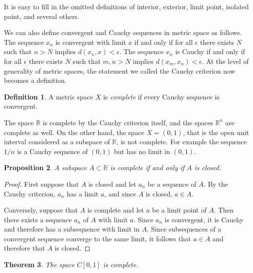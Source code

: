 \documentclass[11pt,oneside]{amsbook}
\newcommand{\RR}{\mathbb R}
\theoremstyle{definition}
\theoremstyle{plain}
\newtheorem{thm}{Theorem}[section]
\newtheorem{prop}[thm]{Proposition}
\theoremstyle{definition}
\newtheorem{defn}[thm]{Definition}
\theoremstyle{remark}
\numberwithin{equation}{section}
\numberwithin{figure}{section}
\begin{document}
It is easy to fill in the omitted definitions of interior, exterior, limit point, isolated point, and several others.

We can also define convergent and Cauchy sequences in metric space as follows. The sequence $x_n$ is convergent with limit $x$ if and only if for all $\epsilon$ there exists $N$ such that $n>N$ implies $d(x_n,x)<\epsilon$. The sequence $x_n$ is Cauchy if and only if for all $\epsilon$ there exists $N$ such that $m,n>N$ implies $d(x_m,x_n)<\epsilon$. At the level of generality of metric spaces, the statement we called the Cauchy criterion now becomes a definition.

\begin{defn}
  A metric space $X$ is \emph{complete} if every Cauchy sequence is convergent.
\end{defn}

The space $\RR$ is complete by the Cauchy criterion itself, and the spaces $\RR^n$ are complete as well. On the other hand, the space $X=(0,1)$, that is the open unit interval considered as a subspace of $\RR$, is not complete. For example the sequence $1/n$ is a Cauchy sequence of $(0,1)$ but has no limit in $(0,1)$.

\begin{prop}
  A subspace $A\subset\RR$ is complete if and only if $A$ is closed.
\end{prop}

\begin{proof}
  First suppose that $A$ is closed and let $a_n$ be a sequence of $A$. By the Cauchy criterion, $a_n$ has a limit $a$, and since $A$ is closed, $a\in A$. 

  Conversely, suppose that $A$ is complete and let $a$ be a limit point of $A$. Then there exists a sequence $a_n$ of $A$ with limit $a$. Since $a_n$ is convergent, it is Cauchy and therefore has a subsequence with limit in $A$. Since subsequences of a convergent sequence converge to the same limit, it follows that $a\in A$ and therefore that $A$ is closed.
\end{proof}

\begin{thm}
  The space $C[0,1]$ is complete.
\end{thm}
\end{document}

